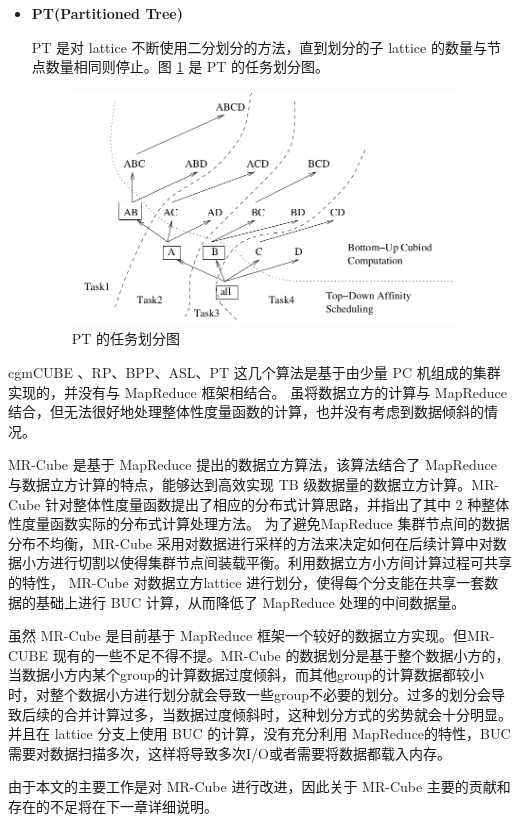 \begin{itemize}
\item \textbf{PT(Partitioned Tree)}

PT 是对 lattice 不断使用二分划分的方法，直到划分的子 lattice 的数量与节点数量相同则停止。图 \ref{cluster_pt} 是 PT 的任务划分图。

\begin{figure}[!htb]
\centering\includegraphics[width=4in]{picture/ch_current_research/cluster_pt} 
\caption{PT 的任务划分图}\label{cluster_pt} 
\end{figure} 

\end{itemize}


cgmCUBE \cite{dehne2006cgmcube}、RP、BPP、ASL、PT\cite{lee2012efficient} 这几个算法是基于由少量 PC 机组成的集群实现的，并没有与 MapReduce 框架相结合。 \cite{you2008parallel} \cite{sergey2009applying} 虽将数据立方的计算与 MapReduce结合，但无法很好地处理整体性度量函数的计算，也并没有考虑到数据倾斜的情况。

MR-Cube \cite{nandi2011distributed} 是基于 MapReduce 提出的数据立方算法，该算法结合了 MapReduce 与数据立方计算的特点，能够达到高效实现 TB 级数据量的数据立方计算。MR-Cube 针对整体性度量函数提出了相应的分布式计算思路，并指出了其中 2 种整体性度量函数实际的分布式计算处理方法。 为了避免MapReduce 集群节点间的数据分布不均衡，MR-Cube 采用对数据进行采样的方法来决定如何在后续计算中对数据小方进行切割以使得集群节点间装载平衡。利用数据立方小方间计算过程可共享的特性， MR-Cube 对数据立方lattice 进行划分，使得每个分支能在共享一套数据的基础上进行 BUC 计算，从而降低了 MapReduce 处理的中间数据量。

虽然 MR-Cube 是目前基于 MapReduce 框架一个较好的数据立方实现。但MR-CUBE 现有的一些不足不得不提。MR-Cube 的数据划分是基于整个数据小方的，当数据小方内某个group的计算数据过度倾斜，而其他group的计算数据都较小时，对整个数据小方进行划分就会导致一些group不必要的划分。过多的划分会导致后续的合并计算过多，当数据过度倾斜时，这种划分方式的劣势就会十分明显。并且在 lattice 分支上使用 BUC 的计算，没有充分利用 MapReduce的特性，BUC 需要对数据扫描多次，这样将导致多次I/O或者需要将数据都载入内存。

由于本文的主要工作是对 MR-Cube 进行改进，因此关于 MR-Cube 主要的贡献和存在的不足将在下一章详细说明。



